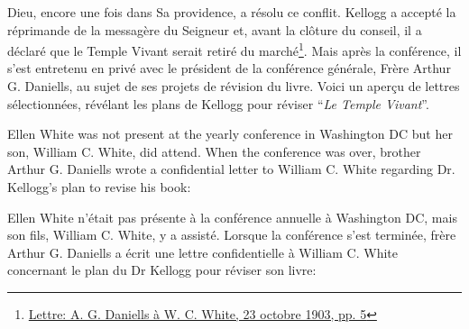 Dieu, encore une fois dans Sa providence, a résolu ce conflit. Kellogg a accepté la réprimande de la messagère du Seigneur et, avant la clôture du conseil, il a déclaré que le Temple Vivant serait retiré du marché\footnote{\href{https://forgottenpillar.com/wp-content/uploads/2022/04/Letter-A-G-Daniells-to-W-C-White-October-29-1903.pdf}{Lettre: A. G. Daniells à W. C. White, 23 octobre 1903, pp. 5}}. Mais après la conférence, il s'est entretenu en privé avec le président de la conférence générale, Frère Arthur G. Daniells, au sujet de ses projets de révision du livre. Voici un aperçu de lettres sélectionnées, révélant les plans de Kellogg pour réviser “\textit{Le Temple Vivant}”.


Ellen White was not present at the yearly conference in Washington DC but her son, William C. White, did attend. When the conference was over, brother Arthur G. Daniells wrote a confidential letter to William C. White regarding Dr. Kellogg's plan to revise his book:


Ellen White n'était pas présente à la conférence annuelle à Washington DC, mais son fils, William C. White, y a assisté. Lorsque la conférence s'est terminée, frère Arthur G. Daniells a écrit une lettre confidentielle à William C. White concernant le plan du Dr Kellogg pour réviser son livre:










